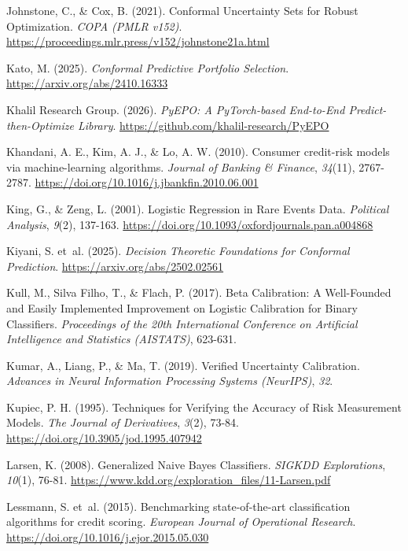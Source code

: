 \documentclass[
  spanish,
  11pt,
  letterpaper,
]{scrbook}
\newlength{\cslhangindent}
\newenvironment{CSLReferences}[2] %
 {\begin{list}{}{%
  \setlength{\itemindent}{0pt}
  \setlength{\leftmargin}{0pt}
  \setlength{\parsep}{0pt}
  \ifodd #1
   \setlength{\leftmargin}{\cslhangindent}
   \setlength{\itemindent}{-1\cslhangindent}
  \fi
  \setlength{\itemsep}{#2\baselineskip}}}
 {\end{list}}
\theoremstyle{plain}
\theoremstyle{remark}
\begin{document}
\begin{CSLReferences}{1}{0}
Johnstone, C., \& Cox, B. (2021). Conformal Uncertainty Sets for Robust
Optimization. \emph{COPA (PMLR v152)}.
\url{https://proceedings.mlr.press/v152/johnstone21a.html}

Kato, M. (2025). \emph{Conformal Predictive Portfolio Selection}.
\url{https://arxiv.org/abs/2410.16333}

Khalil Research Group. (2026). \emph{{PyEPO}: A {PyTorch}-based
End-to-End Predict-then-Optimize Library}.
\url{https://github.com/khalil-research/PyEPO}

Khandani, A. E., Kim, A. J., \& Lo, A. W. (2010). Consumer credit-risk
models via machine-learning algorithms. \emph{Journal of Banking \&
Finance}, \emph{34}(11), 2767-2787.
\url{https://doi.org/10.1016/j.jbankfin.2010.06.001}

King, G., \& Zeng, L. (2001). Logistic Regression in Rare Events Data.
\emph{Political Analysis}, \emph{9}(2), 137-163.
\url{https://doi.org/10.1093/oxfordjournals.pan.a004868}

{Kiyani, S. et~al.} (2025). \emph{Decision Theoretic Foundations for
Conformal Prediction}. \url{https://arxiv.org/abs/2502.02561}

Kull, M., Silva Filho, T., \& Flach, P. (2017). Beta Calibration: A
Well-Founded and Easily Implemented Improvement on Logistic Calibration
for Binary Classifiers. \emph{Proceedings of the 20th International
Conference on Artificial Intelligence and Statistics (AISTATS)},
623-631.

Kumar, A., Liang, P., \& Ma, T. (2019). Verified Uncertainty
Calibration. \emph{Advances in Neural Information Processing Systems
(NeurIPS)}, \emph{32}.

Kupiec, P. H. (1995). Techniques for Verifying the Accuracy of Risk
Measurement Models. \emph{The Journal of Derivatives}, \emph{3}(2),
73-84. \url{https://doi.org/10.3905/jod.1995.407942}

Larsen, K. (2008). Generalized Naive Bayes Classifiers. \emph{SIGKDD
Explorations}, \emph{10}(1), 76-81.
\url{https://www.kdd.org/exploration_files/11-Larsen.pdf}

{Lessmann, S. et~al.} (2015). Benchmarking state-of-the-art
classification algorithms for credit scoring. \emph{European Journal of
Operational Research}. \url{https://doi.org/10.1016/j.ejor.2015.05.030}


\end{CSLReferences}
\end{document}
